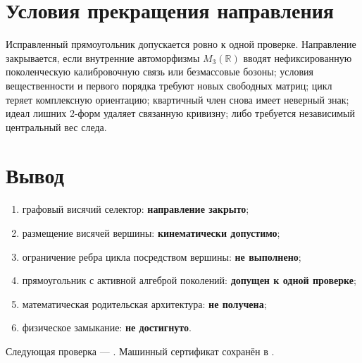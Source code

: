 \section{Условия прекращения направления}

Исправленный прямоугольник допускается ровно к одной проверке. Направление
закрывается, если внутренние автоморфизмы \(M_3(\mathbb R)\) вводят
нефиксированную поколенческую калибровочную связь или безмассовые бозоны;
условия вещественности и первого порядка требуют новых свободных матриц;
цикл теряет комплексную ориентацию; квартичный член снова имеет неверный
знак; идеал лишних 2-форм удаляет связанную кривизну; либо требуется
независимый центральный вес следа.

\section{Вывод}

\begin{protocol}
\begin{enumerate}
 \item графовый висячий селектор: \textbf{направление закрыто};
 \item размещение висячей вершины: \textbf{кинематически допустимо};
 \item ограничение ребра цикла посредством вершины: \textbf{не выполнено};
 \item прямоугольник с активной алгеброй поколений:
 \textbf{допущен к одной проверке};
 \item математическая родительская архитектура: \textbf{не получена};
 \item физическое замыкание: \textbf{не достигнуто}.
\end{enumerate}
\end{protocol}

Следующая проверка --- .
Машинный сертификат сохранён в
.